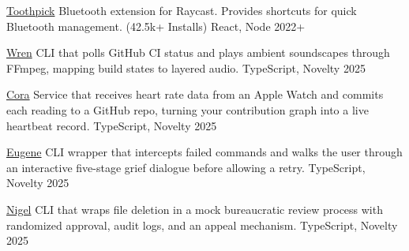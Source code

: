 

\begin{cvhonors}

  \cvhonor
    {\href{https://github.com/raycast/extensions/tree/HEAD/extensions/toothpick/}{Toothpick}} %
    {Bluetooth extension for Raycast. Provides shortcuts for quick Bluetooth management. (42.5k+ Installs)} %
    {React, Node} %
    {2022+} %

  \cvhonor
    {\href{https://github.com/VladCuciureanu/Wren}{Wren}} %
    {CLI that polls GitHub CI status and plays ambient soundscapes through FFmpeg, mapping build states to layered audio.} %
    {TypeScript, Novelty} %
    {2025} %

  \cvhonor
    {\href{https://github.com/VladCuciureanu/Cora}{Cora}} %
    {Service that receives heart rate data from an Apple Watch and commits each reading to a GitHub repo, turning your contribution graph into a live heartbeat record.} %
    {TypeScript, Novelty} %
    {2025} %

  \cvhonor
    {\href{https://github.com/VladCuciureanu/Eugene}{Eugene}} %
    {CLI wrapper that intercepts failed commands and walks the user through an interactive five-stage grief dialogue before allowing a retry.} %
    {TypeScript, Novelty} %
    {2025} %

  \cvhonor
    {\href{https://github.com/VladCuciureanu/Nigel}{Nigel}} %
    {CLI that wraps file deletion in a mock bureaucratic review process with randomized approval, audit logs, and an appeal mechanism.} %
    {TypeScript, Novelty} %
    {2025} %

\end{cvhonors}
